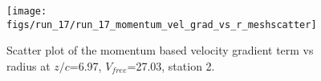 \begin{figure}[H]
\centering
\texttt{[image: figs/run\_17/run\_17\_momentum\_vel\_grad\_vs\_r\_meshscatter]}
\caption{Scatter plot of the momentum based velocity gradient term vs radius at $z/c$=6.97, $V_{free}$=27.03, station 2.}
\label{fig:run_17_momentum_vel_grad_vs_r_meshscatter}
\end{figure}


